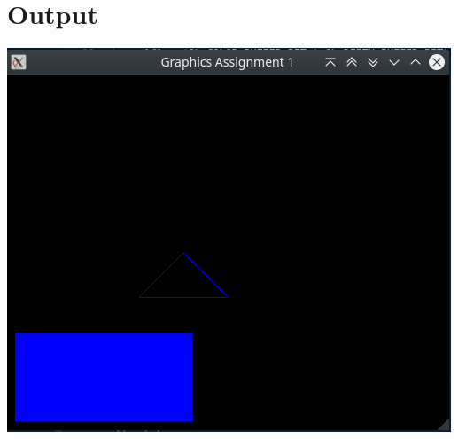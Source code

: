 \documentclass[a4paper, 11pt]{article}
\begin{document}
	\section*{Output}
	\includegraphics[scale=0.5]{graphicsAssign1}
	
	
\end{document}
